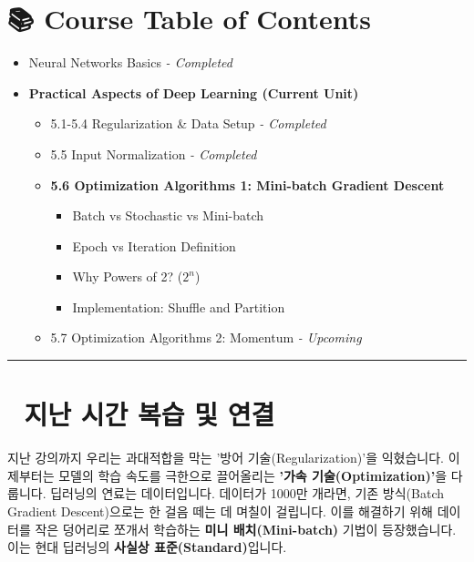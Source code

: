 \documentclass[11pt,a4paper]{book}
\theoremstyle{definition}
\begin{document}
\section*{📚 Course Table of Contents}
\begin{itemize}
    \item[Chapter 1-4.] Neural Networks Basics \textit{- Completed}
    \item[\textbf{Chapter 5.}] \textbf{Practical Aspects of Deep Learning (Current Unit)}
    \begin{itemize}
        \item 5.1-5.4 Regularization \& Data Setup \textit{- Completed}
        \item 5.5 Input Normalization \textit{- Completed}
        \item \textbf{5.6 Optimization Algorithms 1: Mini-batch Gradient Descent}
        \begin{itemize}
            \item Batch vs Stochastic vs Mini-batch
            \item Epoch vs Iteration Definition
            \item Why Powers of 2? ($2^n$)
            \item Implementation: Shuffle and Partition
        \end{itemize}
        \item 5.7 Optimization Algorithms 2: Momentum \textit{- Upcoming}
    \end{itemize}
\end{itemize}

\vspace{0.5cm}
\hrule
\vspace{0.5cm}

\section*{🔗 지난 시간 복습 및 연결}
지난 강의까지 우리는 과대적합을 막는 '방어 기술(Regularization)'을 익혔습니다. 이제부터는 모델의 학습 속도를 극한으로 끌어올리는 \textbf{'가속 기술(Optimization)'}을 다룹니다.
딥러닝의 연료는 데이터입니다. 데이터가 1000만 개라면, 기존 방식(Batch Gradient Descent)으로는 한 걸음 떼는 데 며칠이 걸립니다. 이를 해결하기 위해 데이터를 작은 덩어리로 쪼개서 학습하는 \textbf{미니 배치(Mini-batch)} 기법이 등장했습니다. 이는 현대 딥러닝의 \textbf{사실상 표준(Standard)}입니다.

\end{document}
